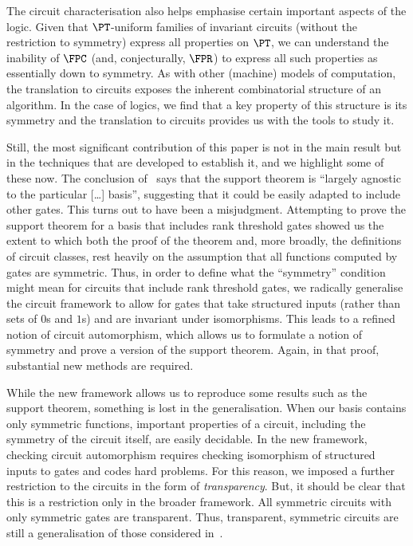 \documentclass[a4paper,UKenglish]{lipics-v2018}
\begin{document}
The circuit characterisation also helps emphasise certain important aspects of
the logic. Given that $\PT$-uniform families of invariant circuits (without the
restriction to symmetry) express all properties on $\PT$, we can understand the
inability of $\FPC$ (and, conjecturally, $\FPR$) to express all such properties
as essentially down to symmetry. As with other (machine) models of computation,
the translation to circuits exposes the inherent combinatorial structure of an
algorithm. In the case of logics, we find that a key property of this structure
is its symmetry and the translation to circuits provides us with the tools to
study it.

Still, the most significant contribution of this paper is not in the main result
but in the techniques that are developed to establish it, and we highlight some
of these now. The conclusion of~\cite{AndersonD17} says that the support theorem
is ``largely agnostic to the particular [\ldots] basis'', suggesting that it
could be easily adapted to include other gates. This turns out to have been a
misjudgment. Attempting to prove the support theorem for a basis that includes
rank threshold gates showed us the extent to which both the proof of the theorem
and, more broadly, the definitions of circuit classes, rest heavily on the
assumption that all functions computed by gates are symmetric. Thus, in order to
define what the ``symmetry'' condition might mean for circuits that include rank
threshold gates, we radically generalise the circuit framework to allow for
gates that take structured inputs (rather than sets of $0$s and $1$s) and are
invariant under isomorphisms. This leads to a refined notion of circuit
automorphism, which allows us to formulate a notion of symmetry and prove a
version of the support theorem. Again, in that proof, substantial new methods
are required.

While the new framework allows us to reproduce some results such as the support
theorem, something is lost in the generalisation. When our basis contains only
symmetric functions, important properties of a circuit, including the symmetry
of the circuit itself, are easily decidable. In the new framework, checking
circuit automorphism requires checking isomorphism of structured inputs to gates
and codes hard problems. For this reason, we imposed a further restriction to
the circuits in the form of \emph{transparency}. But, it should be clear that
this is a restriction only in the broader framework. All symmetric circuits with
only symmetric gates are transparent. Thus, transparent, symmetric circuits are
still a generalisation of those considered in~\cite{AndersonD17}.
\end{document}
